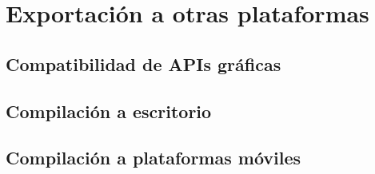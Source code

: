 \section{Exportación a otras plataformas}

\subsection{Compatibilidad de APIs gráficas}

\subsection{Compilación a escritorio}

\subsection{Compilación a plataformas móviles}